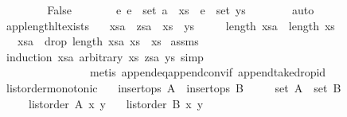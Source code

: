 \begin{isabellebody}
\ \ \isamarkupfalse%
\isanewline
\ \ \ \ \isamarkupfalse%
\ False\isanewline
\ \ \ \ \isamarkupfalse%
\ \isamarkupfalse%
\ {\isachardoublequoteopen}{\isasymexists}e{\isachardot}\ e\ {\isasymin}\ set\ {\isacharparenleft}a\ {\isacharhash}\ xs{\isacharparenright}\ {\isasymand}\ e\ {\isasymnotin}\ set\ ys{\isachardoublequoteclose}\isanewline
\ \ \ \ \ \ \isamarkupfalse%
\ auto\isanewline
\ \ \isamarkupfalse%
\isanewline
{}\isamarkupfalse%
%
\endisatagproof
{\isafoldproof}%
%
\isadelimproof
\isanewline
%
\endisadelimproof
\isanewline
{}\isamarkupfalse%
\ app{\isacharunderscore}length{\isacharunderscore}lt{\isacharunderscore}exists{\isacharcolon}\isanewline
\ \ \ {\isachardoublequoteopen}xsa\ {\isacharat}\ zsa\ {\isacharequal}\ xs\ {\isacharat}\ ys{\isachardoublequoteclose}\isanewline
\ \ \ \ \ {\isachardoublequoteopen}length\ xsa\ {\isasymle}\ length\ xs{\isachardoublequoteclose}\isanewline
\ \ \ {\isachardoublequoteopen}xsa\ {\isacharat}\ {\isacharparenleft}drop\ {\isacharparenleft}length\ xsa{\isacharparenright}\ xs{\isacharparenright}\ {\isacharequal}\ xs{\isachardoublequoteclose}\isanewline
%
\isadelimproof
%
\endisadelimproof
%
\isatagproof
{}\isamarkupfalse%
\ assms\ \isamarkupfalse%
\ {\isacharparenleft}induction\ xsa\ arbitrary{\isacharcolon}\ xs\ zsa\ ys{\isacharcomma}\ simp{\isacharcomma}\isanewline
\ \ \ \ \ \ \ \ \ \ \ \ \ \ \ \ metis\ append{\isacharunderscore}eq{\isacharunderscore}append{\isacharunderscore}conv{\isacharunderscore}if\ append{\isacharunderscore}take{\isacharunderscore}drop{\isacharunderscore}id{\isacharparenright}%
\endisatagproof
{\isafoldproof}%
%
\isadelimproof
\isanewline
%
\endisadelimproof
\isanewline
{}\isamarkupfalse%
\ list{\isacharunderscore}order{\isacharunderscore}monotonic{\isacharcolon}\isanewline
\ \ \ {\isachardoublequoteopen}insert{\isacharunderscore}ops\ A{\isachardoublequoteclose}\ \ {\isachardoublequoteopen}insert{\isacharunderscore}ops\ B{\isachardoublequoteclose}\isanewline
\ \ \ \ \ {\isachardoublequoteopen}set\ A\ {\isasymsubseteq}\ set\ B{\isachardoublequoteclose}\isanewline
\ \ \ \ \ {\isachardoublequoteopen}list{\isacharunderscore}order\ A\ x\ y{\isachardoublequoteclose}\isanewline
\ \ \ {\isachardoublequoteopen}list{\isacharunderscore}order\ B\ x\ y{\isachardoublequoteclose}\isanewline
%
\isadelimproof

\end{isabellebody}
